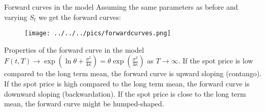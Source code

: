 Forward curves in the model
	Assuming the same parameters as before and varying $S_t$ we get the forward curves:
	\begin{figure}
		\centering
			\texttt{[image: ../../../pics/forwardcurves.png]}
		\label{fig:forwardcurves}
	\end{figure}


Properties of the forward curve in the model
	$F(t,T) \rightarrow \exp(\ln \theta + \frac{\sigma^2}{4 \kappa}) = \theta \exp{(\frac{\sigma^2}{4\kappa})}$ as $T \rightarrow \infty$.
	If the spot price is low compared to the long term mean, the forward curve is upward sloping (contango).
	If the spot price is high compared to the long term mean, the forward curve is downward sloping (backwardation).
	If the spot price is close to the long term mean, the forward curve might be humped-shaped.

